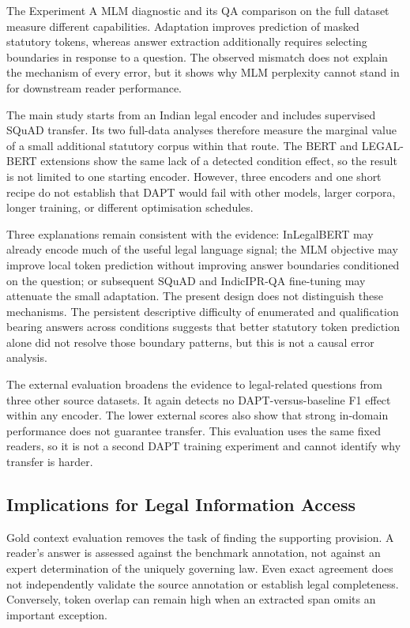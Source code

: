 \documentclass[pdflatex,sn-basic]{sn-jnl}
\begin{document}
The Experiment A MLM diagnostic and its QA comparison on the full dataset measure
different capabilities.
Adaptation improves prediction of masked statutory tokens, whereas answer
extraction additionally requires selecting boundaries in response to a question.
The observed mismatch does not explain the mechanism of every error, but it
shows why MLM perplexity cannot stand in for downstream reader performance.

The main study starts from an Indian legal encoder and includes supervised
SQuAD transfer. Its two full-data analyses therefore measure the marginal value
of a small additional statutory corpus within that route. The BERT and
LEGAL-BERT extensions show the same lack of a detected condition effect, so the
result is not limited to one starting encoder. However, three encoders and one
short recipe do not establish that DAPT would fail with other models, larger
corpora, longer training, or different optimisation schedules.

Three explanations remain consistent with the evidence: InLegalBERT may
already encode much of the useful legal language signal; the MLM objective may
improve local token prediction without improving answer boundaries conditioned
on the question; or subsequent SQuAD and IndicIPR-QA fine-tuning may attenuate the
small adaptation. The present design does not distinguish these mechanisms.
The persistent descriptive difficulty of enumerated and qualification bearing
answers across conditions suggests that better statutory token prediction
alone did not resolve those boundary patterns, but this is not a causal error
analysis.

The external evaluation broadens the evidence to legal-related questions from
three other source datasets. It again detects no DAPT-versus-baseline F1 effect
within any encoder. The lower external scores also show that strong in-domain
performance does not guarantee transfer. This evaluation uses the same fixed
readers, so it is not a second DAPT training experiment and cannot identify why
transfer is harder.

\subsection{Implications for Legal Information Access}

Gold context evaluation removes the task of finding the supporting provision.
A reader's answer is assessed against the benchmark annotation, not against
an expert determination of the uniquely governing law. Even exact agreement
does not independently validate the source annotation or establish legal
completeness. Conversely, token overlap can remain high when an extracted
span omits an important exception.
\end{document}
